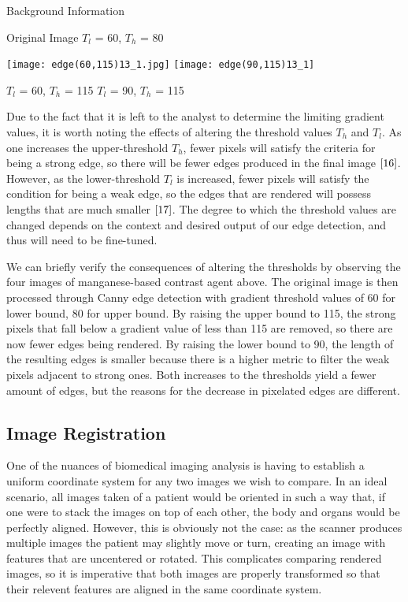 \documentclass[a4paper,12pt]{article}
\begin{document}
\begin{section}{Background Information}
\begin{center}
Original Image \hspace{25mm} $T_l$ = 60, $T_h$ = 80
\end{center}
\begin{center}
\texttt{[image: edge(60,115)13\_1.jpg]}
\texttt{[image: edge(90,115)13\_1]}

$T_l$ = 60, $T_h$ = 115 \hspace{20mm} $T_l$ = 90, $T_h$ = 115
\end{center}

Due to the fact that it is left to the analyst to determine the limiting gradient values, it is worth noting the effects of altering the threshold values $T_h$ and $T_l$.
As one increases the upper-threshold $T_h$, fewer pixels will satisfy the criteria for being a strong edge, so there will be fewer edges produced in the final image $\cite{16}$.
However, as the lower-threshold $T_l$ is increased, fewer pixels will satisfy the condition for being a weak edge, so the edges that are rendered will possess lengths that are much smaller $\cite{17}$.
The degree to which the threshold values are changed depends on the context and desired output of our edge detection, and thus will need to be fine-tuned. 

We can briefly verify the consequences of altering the thresholds by observing the four images of manganese-based contrast agent above. The original image is then processed through Canny edge detection with gradient threshold values of 60 for lower bound, 80 for upper bound. By raising the upper bound to 115, the strong pixels that fall below a gradient value of less than 115 are removed, so there are now fewer edges being rendered. By raising the lower bound to 90, the length of the resulting edges is smaller because there is a higher metric to filter the weak pixels adjacent to strong ones. Both increases to the thresholds yield a fewer amount of edges, but the reasons for the decrease in pixelated edges are different.

\subsection{Image Registration}

One of the nuances of biomedical imaging analysis is having to establish a uniform coordinate system for any two images we wish to compare. In an ideal scenario, all images taken of a patient would be oriented in such a way that, if one were to stack the images on top of each other, the body and organs would be perfectly aligned. However, this is obviously not the case: as the scanner produces multiple images the patient may slightly move or turn, creating an image with features that are uncentered or rotated. This complicates comparing rendered images, so it is imperative that both images are properly transformed so that their relevent features are aligned in the same coordinate system. 


\end{section}
\end{document}
